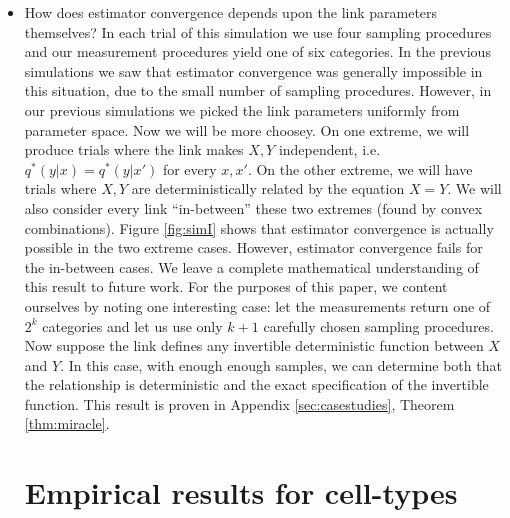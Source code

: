 \begin{itemize}
    \item How does estimator convergence depends upon the link parameters themselves?  In each trial of this simulation we use four sampling procedures and our measurement procedures yield one of six categories.  In the previous simulations we saw that estimator convergence was generally impossible in this situation, due to the small number of sampling procedures.  However, in our previous simulations we picked the link parameters uniformly from parameter space.  Now we will be more choosey.   On one extreme, we will produce trials where the link makes $X,Y$ independent, i.e. $q^*(y|x)=q^*(y|x')$ for every $x,x'$.  On the other extreme, we will have trials where $X,Y$ are deterministically related by the equation $X=Y$.  We will also consider every link ``in-between'' these two extremes (found by convex combinations).  Figure \ref{fig:simI} shows that estimator convergence is actually possible in the two extreme cases.  However, estimator convergence fails for the in-between cases.  We leave a complete mathematical understanding of this result to future work.  For the purposes of this paper, we content ourselves by noting one interesting case: let the measurements return one of $2^k$ categories and let us use only $k+1$ carefully chosen sampling procedures.  Now suppose the link defines any invertible deterministic function between $X$ and $Y$.  In this case, with enough enough samples, we can determine both that the relationship is deterministic and the exact specification of the invertible function.  This result is proven in Appendix \ref{sec:casestudies}, Theorem \ref{thm:miracle}.

                                       

\section{Empirical results for cell-types}


\end{itemize}
